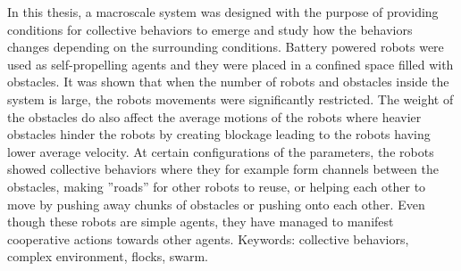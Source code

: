 In this thesis, a macroscale system was designed with the purpose of 
providing conditions for collective behaviors to emerge and study 
how the behaviors changes depending on the surrounding conditions. 
Battery powered robots were used as self-propelling agents and they 
were placed in a confined space filled with obstacles.
It was shown that when the number of robots and obstacles inside 
the system is large, the robots movements were significantly restricted.
The weight of the obstacles do also affect the average 
motions of the robots where heavier obstacles hinder 
the robots by creating blockage leading to the robots 
having lower average velocity.
At certain configurations of the parameters, the robots showed 
collective behaviors where they for example form channels 
between the obstacles, making ''roads'' for other robots to reuse, 
or helping each other to move by pushing away chunks of obstacles 
or pushing onto each other. Even though these robots are simple agents, 
they have managed to manifest cooperative actions towards other agents. 
\vfill
Keywords: collective behaviors, complex environment, flocks, swarm.

\newpage				%
\thispagestyle{empty}
\mbox{}
